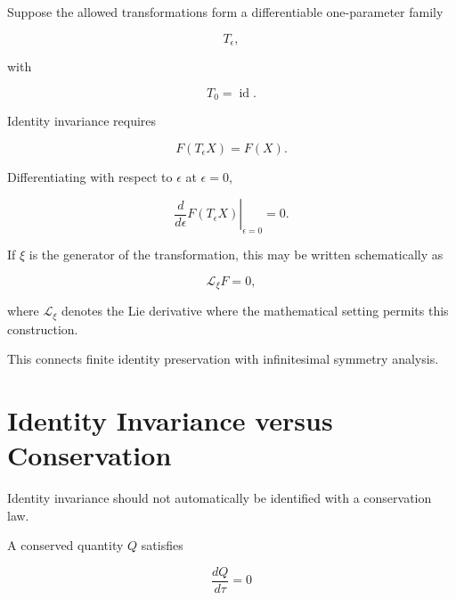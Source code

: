 \documentclass[12pt,oneside]{book}
\begin{document}
Suppose the allowed transformations form a differentiable
one-parameter family

\begin{equation}
    T_\epsilon,
\end{equation}

with

\begin{equation}
    T_0
    =
    \operatorname{id}.
\end{equation}

Identity invariance requires

\begin{equation}
    F(T_\epsilon X)
    =
    F(X).
\end{equation}

Differentiating with respect to \(\epsilon\) at
\(\epsilon=0\),

\begin{equation}
    \left.
    \frac{d}{d\epsilon}
    F(T_\epsilon X)
    \right|_{\epsilon=0}
    =
    0.
    \label{eq:infinitesimal-invariance}
\end{equation}

If \(\xi\) is the generator of the transformation, this may be
written schematically as

\begin{equation}
    \mathcal{L}_{\xi}F
    =
    0,
    \label{eq:lie-identity-invariance}
\end{equation}

where \(\mathcal{L}_{\xi}\) denotes the Lie derivative where the
mathematical setting permits this construction.

This connects finite identity preservation with infinitesimal
symmetry analysis.


\section{Identity Invariance versus Conservation}
\label{sec:identity-versus-conservation}

Identity invariance should not automatically be identified with
a conservation law.

A conserved quantity \(Q\) satisfies

\begin{equation}
    \frac{dQ}{d\tau}
    =
    0
\end{equation}
\end{document}
